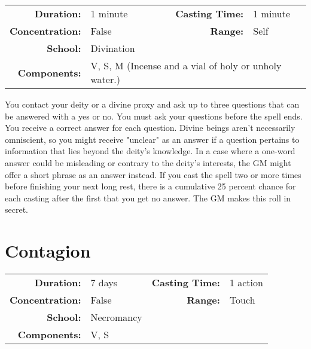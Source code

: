 \documentclass[a5paper, 12pt]{memoir}
\begin{document}
{
\small\centering\vspace{-6pt}
\begin{tabular}{rlrl}
\toprule

\textbf{Duration:} & 1 minute &
\textbf{Casting Time:} & 1 minute \\
\textbf{Concentration:} & False &
\textbf{Range:} & Self \\
\textbf{School:} & Divination \\
\textbf{Components:} & \multicolumn{3}{p{0.7\textwidth}}{V, S, M (Incense and a vial of holy or unholy water.)}\\

\bottomrule
\end{tabular}
}

\vspace{1\baselineskip}\noindent You contact your deity or a divine proxy and ask up to three questions that can be answered with a yes or no. You must ask your questions before the spell ends. You receive a correct answer for each question. Divine beings aren't necessarily omniscient, so you might receive "unclear" as an answer if a question pertains to information that lies beyond the deity's knowledge. In a case where a one-word answer could be misleading or contrary to the deity's interests, the GM might offer a short phrase as an answer instead. If you cast the spell two or more times before finishing your next long rest, there is a cumulative 25 percent chance for each casting after the first that you get no answer. The GM makes this roll in secret.

\newpage
\section*{Contagion}

{
\small\centering\vspace{-6pt}
\begin{tabular}{rlrl}
\toprule

\textbf{Duration:} & 7 days &
\textbf{Casting Time:} & 1 action \\
\textbf{Concentration:} & False &
\textbf{Range:} & Touch \\
\textbf{School:} & Necromancy \\
\textbf{Components:} & \multicolumn{3}{p{0.7\textwidth}}{V, S}\\

\bottomrule
\end{tabular}
}
\end{document}
